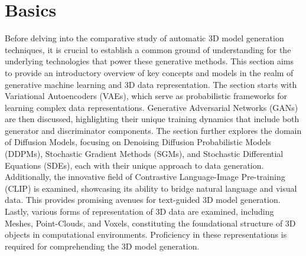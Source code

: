 \chapter{Basics}
\label{ch:basics}

Before delving into the comparative study of automatic 3D model generation techniques, it is crucial to establish a common ground of understanding for the underlying technologies that power these generative methods. This section aims to provide an introductory overview of key concepts and models in the realm of generative machine learning and 3D data representation. The section starts with Variational Autoencoders (VAEs), which serve as probabilistic frameworks for learning complex data representations. Generative Adversarial Networks (GANs) are then discussed, highlighting their unique training dynamics that include both generator and discriminator components. The section further explores the domain of Diffusion Models, focusing on Denoising Diffusion Probabilistic Models (DDPMs), Stochastic Gradient Methods (SGMs), and Stochastic Differential Equations (SDEs), each with their unique approach to data generation. Additionally, the innovative field of Contrastive Language-Image Pre-training (CLIP) is examined, showcasing its ability to bridge natural language and visual data. This provides promising avenues for text-guided 3D model generation. Lastly, various forms of representation of 3D data are examined, including Meshes, Point-Clouds, and Voxels, constituting the foundational structure of 3D objects in computational environments. Proficiency in these representations is required for comprehending the 3D model generation.






